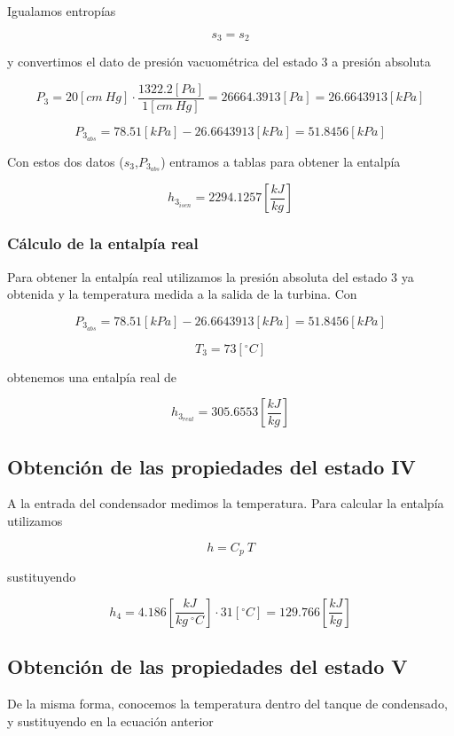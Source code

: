\documentclass[12pt,letterpaper]{article}
\begin{document}
Igualamos entropías

$$
    s_3 = s_2
$$

y convertimos el dato de presión vacuométrica del estado 3 a presión absoluta

$$
    P_3 = 20[cm\ Hg] \cdot \frac{1322.2[Pa]}{1[cm\ Hg]} = 26664.3913[Pa] = 26.6643913[kPa] 
$$

$$
    P_{3_{abs}} = 78.51[kPa] - 26.6643913[kPa] = 51.8456[kPa]
$$

Con estos dos datos ($s_3$,$P_{3_{abs}}$) entramos a tablas para obtener la entalpía

$$
    h_{3_{isen}} = 2294.1257 \left[\frac{kJ}{kg}\right]
$$

\subsubsection{Cálculo de la entalpía real}

Para obtener la entalpía real utilizamos la presión absoluta del estado 3 ya obtenida y 
la temperatura medida a la salida de la turbina. Con

$$
    P_{3_{abs}} = 78.51[kPa] - 26.6643913[kPa] = 51.8456[kPa]
$$

$$
    T_3 = 73[^\circ C]
$$

obtenemos una entalpía real de

$$
    h_{3_{real}} = 305.6553 \left[\frac{kJ}{kg}\right]
$$

\subsection{Obtención de las propiedades del estado IV} \label{sec:estadoIV}

A la entrada del condensador medimos la temperatura. Para calcular la entalpía utilizamos

\begin{equation}
    h = C_p\ T
\end{equation}

sustituyendo

$$
    h_4 = 4.186\left[\frac{kJ}{kg\ ^\circ C}\right] \cdot 31[^\circ C]
    = 129.766 \left[\frac{kJ}{kg}\right]
$$

\subsection{Obtención de las propiedades del estado V}

De la misma forma, conocemos la temperatura dentro del tanque de condensado, 
y sustituyendo en la ecuación anterior
\end{document}
